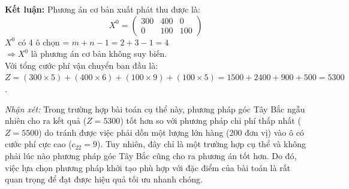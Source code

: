 \textbf{Kết luận:} Phương án cơ bản xuất phát thu được là:
\[ X^0 = \begin{pmatrix} 300 & 400 & 0 \\ 0 & 100 & 100 \end{pmatrix} \]
$X^0$ có 4 ô chọn = $m + n - 1 = 2 + 3 - 1 = 4$ \\
$\Rightarrow X^0$ là phương án cơ bản không suy biến. \\
Với tổng cước phí vận chuyển ban đầu là: 
$Z = (300 \times 5) + (400 \times 6) + (100 \times 9) + (100 \times 5) = 1500 + 2400 + 900 + 500 = 5300$.

\textit{Nhận xét:} Trong trường hợp bài toán cụ thể này, phương pháp góc Tây Bắc ngẫu nhiên cho ra kết quả ($Z = 5300$) tốt hơn so với phương pháp chi phí thấp nhất ($Z = 5500$) do tránh được việc phải dồn một lượng lớn hàng (200 đơn vị) vào ô có cước phí cực cao ($c_{22}=9$). Tuy nhiên, đây chỉ là một trường hợp cụ thể và không phải lúc nào phương pháp góc Tây Bắc cũng cho ra phương án tốt hơn. Do đó, việc lựa chọn phương pháp khởi tạo phù hợp với đặc điểm của bài toán là rất quan trọng để đạt được hiệu quả tối ưu nhanh chóng.